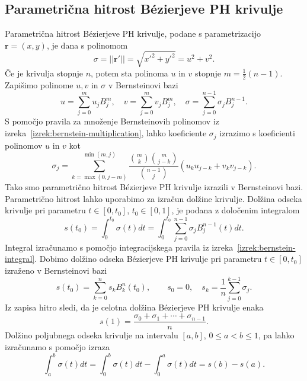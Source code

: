 \documentclass[isrm2, tisk]{fmfdelo}
\newcommand{\mycomment}[1]{\textbf{\textcolor{red}{#1}}}
\begin{document}
%
%
%
%

    \subsection{Parametrična hitrost Bézierjeve PH krivulje}\label{sec:param-hitrost-ph}
    Parametrična hitrost Bézierjeve PH krivulje, podane s parametrizacijo $\mathbf{r}=(x,y)$, je dana s polinomom
    \[\sigma = ||\mathbf{r}'|| = \sqrt{x'^2+y'^2} = u^2+v^2.\]
    Če je krivulja stopnje $n$, potem sta polinoma $u$ in $v$ stopnje $m=\frac{1}{2}(n-1)$.
    Zapišimo polinome $u,v$ in $\sigma$ v Bernsteinovi bazi \[u=\sum_{j=0}^{m}u_j B_{j}^{m}, \quad v=\sum_{j=0}^{m}v_j B_{j}^{m}, \quad \sigma=\sum_{j=0}^{n-1}\sigma_j B_j^{n-1}.\]
    S pomočjo pravila za množenje Bernsteinovih polinomov iz izreka~\ref{izrek:bernstein-multiplication}, lahko koeficiente $\sigma_j$ izrazimo s koeficienti polinomov $u$ in $v$ kot
    \[\sigma_j = \sum_{k=\max(0,j-m)}^{\min(m,j)} \frac{\binom{m}{k}\binom{m}{j-k}}{\binom{n-1}{j}}(u_k u_{j-k}+v_k v_{j-k}).\]
    Tako smo parametrično hitrost Bézierjeve PH krivulje izrazili v Bernsteinovi bazi.
    Parametrično hitrost lahko uporabimo za izračun dolžine krivulje.
    Dolžina odseka krivulje pri parametru $t \in [0,t_0]$, $t_0\in[0,1]$, je podana z določenim integralom
    \[s(t_0)=\int_0^{t_0}\sigma(t)dt = \int_0^{t_0}\sum_{j=0}^{n-1}\sigma_j B_j^{n-1}(t)dt.\]
    Integral izračunamo s pomočjo integracijskega pravila iz izreka~\ref{izrek:bernstein-integral}.
    Dobimo dolžino odseka Bézierjeve PH krivulje pri parametru $t \in [0,t_0]$ izraženo v Bernsteinovi bazi
    \[s(t_0)=\sum_{k=0}^n s_k B_k^{n}(t_0),\qquad s_0=0,\quad s_k = \frac{1}{n}\sum^{k-1}_{j=0}\sigma_j.\]
    Iz zapisa hitro sledi, da je celotna dolžina Bézierjeve PH krivulje enaka \[s(1)=\frac{\sigma_0+\sigma_1+\cdots+\sigma_{n-1}}{n}.\]
    Dolžino poljubnega odseka krivulje na intervalu $[a,b]$, $0\leq a < b\leq1$, pa lahko izračunamo s pomočjo izraza
    \[\int_a^b \sigma(t)dt = \int_0^b\sigma(t)dt - \int_0^a\sigma(t)dt = s(b)-s(a).\]
\end{document}
